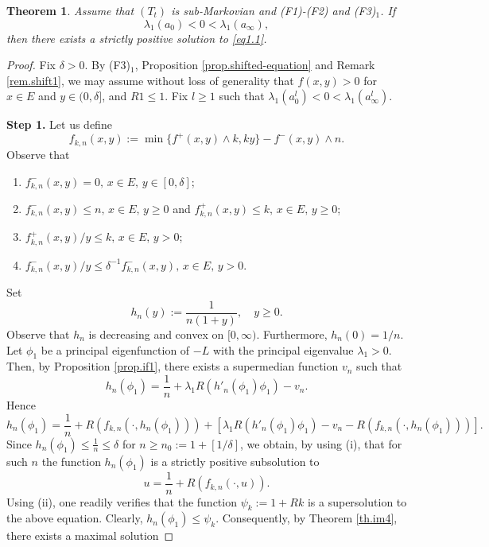\documentclass[11pt,a4paper,reqno]{amsart}
\newtheorem{theorem}{\bf Theorem}[section]
\theoremstyle{definition}
\numberwithin{equation}{section}
\begin{document}
\begin{theorem}
\label{th.mainm}
Assume that $(T_t)$ is sub-Markovian and (F1)-(F2) and (F3)$_1$. If 
\[
\lambda_1(a_0)<0< \lambda_1(a_\infty),
\]
then there exists a strictly positive   solution to \eqref{eq1.1}.
\end{theorem}
\begin{proof}
Fix $\delta>0$. By (F3)$_1$, Proposition \ref{prop.shifted-equation} and Remark \ref{rem.shift1}, 
we may assume without loss of generality that
$f(x,y)>0$ for $x\in E$ and $y\in(0,\delta]$, and $R1\le 1$.  Fix $l\ge 1$ such  that $\lambda_1(a_0^l)<0<\lambda_1(a_\infty^l)$. 

{\bf Step 1.} Let us define 
\begin{equation}
\label{eq.fkn}
f_{k,n}(x,y):= \min\{f^+(x,y)\wedge k, ky\}-f^-(x,y)\wedge n.
\end{equation}
Observe that 
\begin{enumerate}
\item[(i)] $f^-_{k,n}(x,y)=0,\, x\in E,\, y\in [0,\delta]$;
\item[(ii)] $f^-_{k,n}(x,y)\le n,\, x\in E,\, y\ge 0$ and $f^+_{k,n}(x,y)\le k,\, x\in E,\, y\ge 0$;
\item[(iii)] $f^+_{k,n}(x,y)/y\le k,\, x\in E,\, y> 0$;
\item[(iv)]  $f^-_{k,n}(x,y)/y\le \delta^{-1} f^-_{k,n}(x,y),\, x\in E,\, y> 0$.
\end{enumerate}
Set 
\begin{equation}
\label{eq.hn}
h_n(y):=\frac{1}{n(1+y)},\quad y\ge 0.
\end{equation}
Observe that $h_n$ is decreasing and convex on $[0,\infty)$. Furthermore, $h_n(0)=1/n$.
Let $\phi_1$ be a principal eigenfunction of $-L$ with the principal eigenvalue $\lambda_1>0$.
Then, by Proposition \ref{prop.if1}, there exists a supermedian function $v_n$ such that
\[
h_n(\phi_1)=\frac1n+\lambda_1R(h'_n(\phi_1)\phi_1)-v_n.
\]
Hence
\[
h_n(\phi_1)=\frac1n+R(f_{k,n}(\cdot,h_n(\phi_1)))+\left[ \lambda_1R(h'_n(\phi_1)\phi_1)-v_n-R(f_{k,n}(\cdot,h_n(\phi_1)))\right].
\]
Since $h_n(\phi_1)\le \frac1n\le \delta$ for $n\ge n_0:=
1+ [1/\delta]$, we obtain, by using (i),  that for such $n$ the function $h_n(\phi_1)$
is a strictly positive subsolution to
\begin{equation}
\label{eq.pkn}
u=\frac1n+R(f_{k,n}(\cdot,u)).
\end{equation}
Using (ii), one readily verifies that the  function $\psi_k:= 1+Rk$ is a supersolution to the above equation. 
Clearly,   $h_n(\phi_1)\le \psi_k$. Consequently, by Theorem \ref{th.im4}, there exists a maximal solution

\end{proof}
\end{document}
